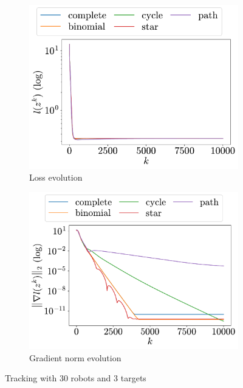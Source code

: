 \documentclass[a4paper,11pt,oneside]{book}
\begin{document}
\begin{figure}[H]
      \centering
      \begin{subfigure}[t]{0.46\linewidth}
            \centering
            \includegraphics[width=\linewidth]{./figs/tracking/30_3_2/loss.pdf} 
            \caption{Loss evolution}
      \end{subfigure}
      \hfill
      \begin{subfigure}[t]{0.46\linewidth}
            \centering
            \includegraphics[width=\linewidth]{./figs/tracking/30_3_2/gradient.pdf} 
            \caption{Gradient norm evolution}
      \end{subfigure}
      \caption{Tracking with $30$ robots and $3$ targets}
      \label{fig:tracking_30_3}
\end{figure}
\end{document}
